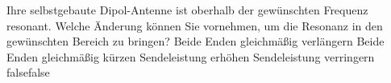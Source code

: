     {Ihre selbstgebaute Dipol-Antenne ist oberhalb der gewünschten Frequenz resonant. Welche Änderung können Sie vornehmen, um die Resonanz in den gewünschten Bereich zu bringen?}
    {Beide Enden gleichmäßig verlängern}
    {Beide Enden gleichmäßig kürzen}
    {Sendeleistung erhöhen}
    {Sendeleistung verringern}
    {false}{false}
